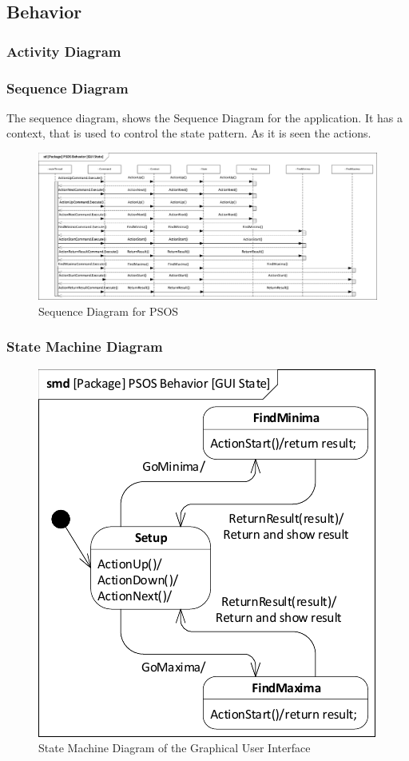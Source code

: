 \subsection{Behavior} \label{requirementspecification:Behavior}

\subsubsection{Activity Diagram}

\subsubsection{Sequence Diagram}
The sequence diagram, shows the Sequence Diagram for the application.
It has a context, that is used to control the state pattern. As it is seen the actions.

\begin{figure}[H]
	\centering
	\includegraphics[width=1\linewidth]{diagram/sd_psos}
	\caption{Sequence Diagram for PSOS}
	\label{fig:sdpsos}
\end{figure}



\subsubsection{State Machine Diagram}\label{req:smd}

\begin{figure}[H]
	\centering
	\includegraphics[width=0.7\linewidth]{diagram/smd_gui_state}
	\caption{State Machine Diagram of the Graphical User Interface}
	\label{fig:smdguistate}
\end{figure}
